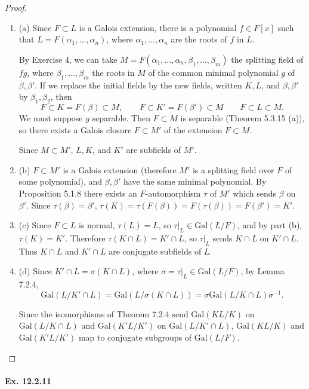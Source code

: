 \documentclass[11pt,a4paper]{article}
\newcommand{\be} {\begin{enumerate}}
\newcommand{\ee} {\end{enumerate}}
\newcommand{\Gal}{\mathrm{Gal}}
\begin{document}
\begin{proof}
\be
\item[(a)] 
Since $F\subset L$ is a Galois extension, there is a polynomial $f \in F[x]$ such that $L = F(\alpha_1,\ldots,\alpha_n)$, where $\alpha_1,\ldots,\alpha_n$ are the roots of $f$ in $L$.

By Exercise 4, we can take $M = F(\alpha_1,\ldots,\alpha_n,\beta_1,\ldots,\beta_m)$ the splitting field of $fg$, where  $\beta_1,\ldots,\beta_m$ the roots in $M$ of the common minimal polynomial $g$ of $\beta,\beta'$. If we replace the initial fields by  the new fields, written $K,L$, and $\beta, \beta'$ by $\beta_1,\beta_2$, then
$$F \subset K = F(\beta) \subset M,\qquad F \subset K' = F(\beta') \subset M\qquad F \subset L \subset M.$$
We must suppose $g$ separable. Then $F\subset M$ is separable (Theorem 5.3.15 (a)), so there exists a Galois closure $F\subset M'$ of the extension $F\subset M$.

Since $M \subset M'$, $L,K$, and $K'$ are subfields of $M'$.

\item[(b)]
$F \subset M'$ is a Galois extension (therefore $M'$ is a splitting field over $F$ of some polynomial), and $\beta,\beta'$ have the same minimal polynomial. By Proposition 5.1.8 there exists an $F$-automorphism $\tau$ of $M'$ which sends $\beta$ on $\beta'$.
Since $\tau(\beta) = \beta'$, $\tau(K) = \tau(F(\beta)) = F(\tau(\beta)) = F(\beta') = K'$.

\item[(c)] Since $F\subset L$ is normal, $\tau(L) = L$, so $\tau|_L \in \Gal(L/F)$,  and by part (b), $\tau(K) = K'$. Therefore $\tau(K \cap L) = K' \cap L$, so $\tau|_L$ sends $K \cap L$ on $K' \cap L$. Thus $K \cap L$ and $K' \cap L$ are conjugate subfields of $L$.

\item[(d)] Since $K' \cap L = \sigma(K \cap L)$, where $\sigma = \tau|_L \in \Gal(L/F)$,  by Lemma 7.2.4,
$$\Gal(L/K'\cap L) = \Gal(L/\sigma(K \cap L)) = \sigma \Gal(L/K\cap L) \sigma^{-1}.$$

Since the isomorphisms of Theorem 7.2.4 send $\Gal(KL/K)$ on $\Gal(L/K\cap L) $ and $\Gal(K'L/K')$ on $\Gal(L/K' \cap L)$, $\Gal(KL/K)$ and $\Gal(K'L/K')$ map to conjugate subgroups of $\Gal(L/F)$.
\ee
\end{proof}

\paragraph{Ex. 12.2.11}  
\end{document}

